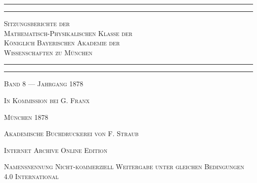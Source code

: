 \documentclass[a4paper, 11pt, oneside]{article}
\begin{document}
\begin{titlepage} %
	\centering %

	
	\rule{\textwidth}{1.6pt}\vspace*{-\baselineskip}\vspace*{2pt} %
	\rule{\textwidth}{0.4pt} %
	
	\vspace{1\baselineskip} %
	
	{\scshape\LARGE Sitzungsberichte der\\[1.25pt] Mathematisch-Physikalischen Klasse der\\[1.25pt] Königlich Bayerischen Akademie der\\[1.25pt] Wissenschaften zu München\\[1.25pt]}
	
	\vspace{1\baselineskip} %

	\rule{\textwidth}{0.4pt}\vspace*{-\baselineskip}\vspace{3.2pt} %
	\rule{\textwidth}{1.6pt} %
	
	\vspace{1\baselineskip} %
	
	
	{\scshape Band 8 --- Jahrgang 1878} %
	
	\vspace*{1\baselineskip} %
	
    {\scshape\small In Kommission bei G. Franx} %
    
    \vspace*{\fill}

	\vspace{1\baselineskip}

	{\small\scshape München 1878}
	
	{\small\scshape{Akademische Buchdruckerei von F. Straub}}
	
	\vspace{0.5\baselineskip} %

    \scshape Internet Archive Online Edition  %
	
	{\scshape\small Namensnennung Nicht-kommerziell Weitergabe unter gleichen Bedingungen 4.0 International} %
\end{titlepage}
\setlength{\parskip}{1mm plus1mm minus1mm}
\clearpage
\tableofcontents
\clearpage
\end{document}

